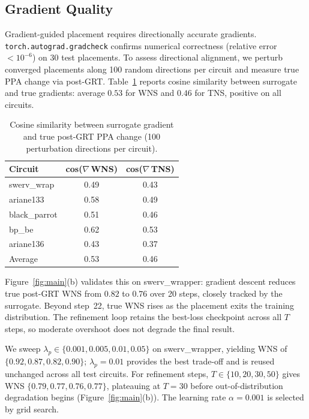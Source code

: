 \documentclass[sigconf,anonymous,review,9pt]{acmart}
\begin{document}
\subsection{Gradient Quality}
\label{subsec:gradient_quality}

Gradient-guided placement requires directionally accurate gradients.
\texttt{torch.autograd.gradcheck} confirms numerical correctness
(relative error $< 10^{-6}$) on 30 test placements. To assess
directional alignment, we perturb converged placements along 100
random directions per circuit and measure true PPA change via
post-GRT. Table~\ref{tab:gradient_quality} reports cosine similarity
between surrogate and true gradients: average $0.53$ for WNS and
$0.46$ for TNS, positive on all circuits.

\begin{table}[h]
\centering
\caption{Cosine similarity between surrogate gradient and true post-GRT PPA change (100 perturbation directions per circuit).}
\label{tab:gradient_quality}
\renewcommand{\arraystretch}{1.15}
\footnotesize
\begin{tabular}{@{}l cc@{}}
\toprule
Circuit & cos($\nabla$\,WNS) & cos($\nabla$\,TNS) \\
\midrule
swerv\_wrap   & 0.49 & 0.43 \\
ariane133     & 0.58 & 0.49 \\
black\_parrot & 0.51 & 0.46 \\
bp\_be        & 0.62 & 0.53 \\
ariane136     & 0.43 & 0.37 \\
\midrule
Average       & 0.53 & 0.46 \\
\bottomrule
\end{tabular}
\renewcommand{\arraystretch}{1.0}
\end{table}

Figure~\ref{fig:main}(b) validates this on swerv\_wrapper: gradient
descent reduces true post-GRT WNS from $0.82$ to $0.76$ over 20
steps, closely tracked by the surrogate. Beyond step~22, true WNS
rises as the placement exits the training distribution. The
refinement loop retains the best-loss checkpoint across all $T$
steps, so moderate overshoot does not degrade the final result.

We sweep $\lambda_p \in \{0.001, 0.005, 0.01, 0.05\}$ on
swerv\_wrapper, yielding WNS of $\{0.92, 0.87, 0.82, 0.90\}$;
$\lambda_p = 0.01$ provides the best trade-off and is reused
unchanged across all test circuits.
For refinement steps, $T \in \{10, 20, 30, 50\}$ gives WNS
$\{0.79, 0.77, 0.76, 0.77\}$, plateauing at $T{=}30$ before
out-of-distribution degradation begins (Figure~\ref{fig:main}(b)).
The learning rate $\alpha{=}0.001$ is selected by grid search.
\end{document}

